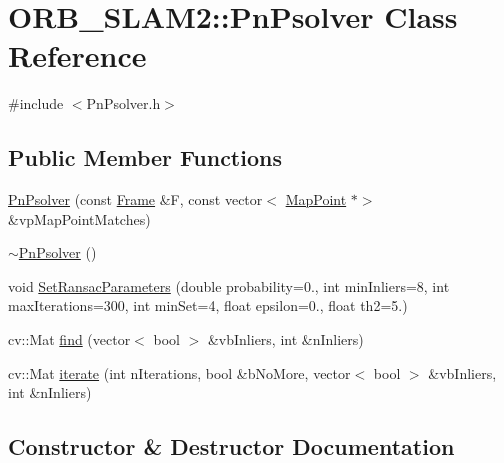 \hypertarget{class_o_r_b___s_l_a_m2_1_1_pn_psolver}{}\section{O\+R\+B\+\_\+\+S\+L\+A\+M2\+:\+:Pn\+Psolver Class Reference}
\label{class_o_r_b___s_l_a_m2_1_1_pn_psolver}


{\ttfamily \#include $<$Pn\+Psolver.\+h$>$}

\subsection*{Public Member Functions}
\begin{DoxyCompactItemize}
\item 
\mbox{\hyperlink{class_o_r_b___s_l_a_m2_1_1_pn_psolver_a7b4cad992a43620e027bfb4bc9ef24f8}{Pn\+Psolver}} (const \mbox{\hyperlink{class_o_r_b___s_l_a_m2_1_1_frame}{Frame}} \&F, const vector$<$ \mbox{\hyperlink{class_o_r_b___s_l_a_m2_1_1_map_point}{Map\+Point}} $\ast$$>$ \&vp\+Map\+Point\+Matches)
\item 
\mbox{\hyperlink{class_o_r_b___s_l_a_m2_1_1_pn_psolver_ad40b921779ed92bfb6b017a76e4d88aa}{$\sim$\+Pn\+Psolver}} ()
\item 
void \mbox{\hyperlink{class_o_r_b___s_l_a_m2_1_1_pn_psolver_adff29377dcc77891a33113080b6b1eb7}{Set\+Ransac\+Parameters}} (double probability=0., int min\+Inliers=8, int max\+Iterations=300, int min\+Set=4, float epsilon=0., float th2=5.)
\item 
cv\+::\+Mat \mbox{\hyperlink{class_o_r_b___s_l_a_m2_1_1_pn_psolver_a784429037a79cb53923f4db181a4d115}{find}} (vector$<$ bool $>$ \&vb\+Inliers, int \&n\+Inliers)
\item 
cv\+::\+Mat \mbox{\hyperlink{class_o_r_b___s_l_a_m2_1_1_pn_psolver_abbef2ac776747661112246e85667f452}{iterate}} (int n\+Iterations, bool \&b\+No\+More, vector$<$ bool $>$ \&vb\+Inliers, int \&n\+Inliers)
\end{DoxyCompactItemize}


\subsection{Constructor \& Destructor Documentation}
\mbox{\label{class_o_r_b___s_l_a_m2_1_1_pn_psolver_a7b4cad992a43620e027bfb4bc9ef24f8}} 
